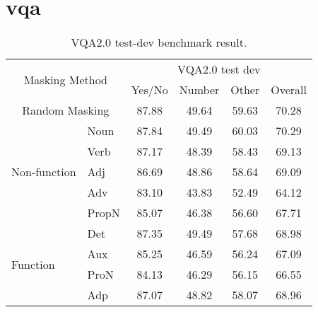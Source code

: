 \section{\Acrlong{vqa}}

\begin{table}[]
    \centering
    \label{tab:vqa}
    \caption{VQA2.0 test-dev benchmark result.}
    \begin{adjustbox}{width=1\textwidth}
        \begin{tabular}{ll|cccc}
            \hline
            \multicolumn{2}{c|}{\multirow{2}{*}{Masking Method}} & \multicolumn{4}{c}{VQA2.0 test dev} \\
            & & Yes/No & Number & Other & Overall \\
            \hline
            \multicolumn{2}{c|}{Random Masking} & 87.88 & 49.64 & 59.63 & 70.28 \\
            \hline
            \multirow{5}{*}{Non-function} & Noun & 87.84 & 49.49 & 60.03 & 70.29 \\
            & Verb & 87.17 & 48.39 & 58.43 & 69.13 \\
            & Adj & 86.69 & 48.86 & 58.64 & 69.09 \\
            & Adv & 83.10 & 43.83 & 52.49 & 64.12 \\
            & PropN & 85.07 & 46.38 & 56.60 & 67.71 \\
            \hline
            \multirow{4}{*}{Function} & Det & 87.35 & 49.49 & 57.68 & 68.98 \\
            & Aux & 85.25 & 46.59 & 56.24 & 67.09 \\
            & ProN & 84.13 & 46.29 & 56.15 & 66.55 \\
            & Adp & 87.07 & 48.82 & 58.07 & 68.96 \\
            \hline
        \end{tabular}
    \end{adjustbox}
\end{table}